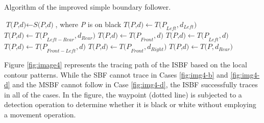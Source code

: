 \documentclass[sensors,article,accept,moreauthors,pdftex,10pt,a4paper]{mdpi}
\begin{document}
\begin{algorithm}[H]
	\caption{Algorithm of the improved simple boundary follower.}\label{alg:isbf}
	\begin{algorithmic}[1]
	\begin{spacing}{1.5}%
	\State $\textit{T(P,d)} \gets \textit{S(P,d)}$, where \textit{P} is on black
	\Do
		\State $\textit{T(P,d)} \gets \textit{T(P}_{Left},\textit{d}_{Left} ) $
	\Else
			\State $\textit{T(P,d)} \gets \textit{T(P}_{Left-Rear},\textit{d}_{Rear} ) $
		\Else
					\State $\textit{T(P,d)} \gets \textit{T(P}_{Front},\textit{d} ) $
					\State $\textit{T(P,d)} \gets \textit{T(P}_{Left}, \textit{d})$
				\Else
					\State $\textit{T(P,d)} \gets \textit{T(P}_{Front-Left},\textit{d} ) $
				\EndIf
				\State $\textit{T(P,d)} \gets \textit{T(P}_{Front},\textit{d}_{Right} ) $
			\Else
				\State $\textit{T(P,d)} \gets \textit{T(P},\textit{d}_{Rear} ) $
			\EndIf
		\EndIf
	\EndIf \linebreak\vspace{-6pt}
	\EndProcedure\vspace{-12pt}
	\end{spacing}%
	\end{algorithmic}
\end{algorithm}


Figure \ref{fig:image4} represents the tracing path of the ISBF based on the local contour patterns. While the SBF cannot trace in Cases \ref{fig:img4-b} and \ref{fig:img4-d} and the MSBF cannot follow in Case \ref{fig:img4-d}, the ISBF successfully traces in all of the cases. In the figure, the waypoint (dotted line) is subjected to a detection operation to determine whether it is black or white without employing a movement operation.
\end{document}

